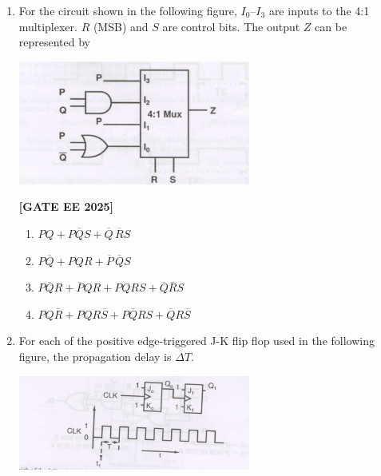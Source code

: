 \documentclass[12pt,a4paper]{article}
\begin{document}
\begin{enumerate}[leftmargin=*, label=\textbf{Q.\arabic*:}]
\item For the circuit shown in the following figure, $I_0$–$I_3$ are inputs to the 4:1 multiplexer. $R$ (MSB) and $S$ are control bits. The output $Z$ can be represented by
\begin{center}
\includegraphics[width=0.6\textwidth]{figs/q58.png}
\end{center}
\newline
\noindent \textbf{[GATE EE 2025]}
\begin{enumerate}[label=(\Alph*)]
  \item $PQ + P\overline{Q}S + \overline{Q}\, \overline{R}S$
  \item $P\overline{Q} + PQR + \overline{P}\, \overline{Q}S$
  \item $P\overline{Q}R + \overline{P}QR + P Q R S + \overline{Q}\overline{R}S$
  \item $P Q \overline{R} + P Q R \overline{S} + P\overline{Q}RS + \overline{Q}R\overline{S}$
\end{enumerate}

\item For each of the positive edge-triggered J-K flip flop used in the following figure, the propagation delay is $\Delta T$.

\begin{center}
\includegraphics[width=0.6\textwidth]{figs/q59a.png}
\end{center}


\end{enumerate}
\end{document}
